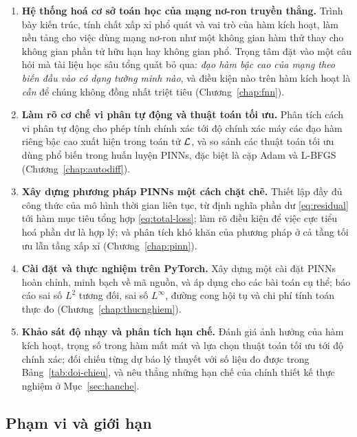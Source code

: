 \begin{enumerate}[label=\textbf{MT\arabic*.},leftmargin=*,itemsep=5pt]
\item \textbf{Hệ thống hoá cơ sở toán học của mạng nơ-ron truyền thẳng.} Trình bày
kiến trúc, tính chất xấp xỉ phổ quát và vai trò của hàm kích hoạt, làm nền tảng
cho việc dùng mạng nơ-ron như một không gian hàm thử thay cho không gian phần tử
hữu hạn hay không gian phổ. Trọng tâm đặt vào một câu hỏi mà tài liệu học sâu tổng
quát bỏ qua: \emph{đạo hàm bậc cao của mạng theo biến đầu vào có dạng tường minh
nào}, và điều kiện nào trên hàm kích hoạt là \emph{cần} để chúng không đồng nhất
triệt tiêu (Chương~\ref{chap:fnn}).
 
\item \textbf{Làm rõ cơ chế vi phân tự động và thuật toán tối ưu.} Phân tích cách
vi phân tự động cho phép tính chính xác tới độ chính xác máy các đạo hàm riêng bậc
cao xuất hiện trong toán tử $\mathcal{L}$, và so sánh các thuật toán tối ưu dùng phổ biến
trong huấn luyện PINNs, đặc biệt là cặp Adam và L-BFGS
(Chương~\ref{chap:autodiff}).
 
\item \textbf{Xây dựng phương pháp PINNs một cách chặt chẽ.} Thiết lập đầy đủ công
thức của mô hình thời gian liên tục, từ định nghĩa phần dư \eqref{eq:residual} tới
hàm mục tiêu tổng hợp \eqref{eq:total-loss}; làm rõ điều kiện để việc cực tiểu hoá
phần dư là hợp lý; và phân tích khó khăn của phương pháp ở cả tầng tối ưu lẫn tầng
xấp xỉ (Chương~\ref{chap:pinn}).
 
\item \textbf{Cài đặt và thực nghiệm trên PyTorch.} Xây dựng một cài đặt PINNs
hoàn chỉnh, minh bạch về mã nguồn, và áp dụng cho các bài toán cụ thể; báo cáo sai
số $L^2$ tương đối, sai số $L^{\infty}$, đường cong hội tụ và chi phí tính toán
thực đo (Chương~\ref{chap:thucnghiem}).
 
\item \textbf{Khảo sát độ nhạy và phân tích hạn chế.} Đánh giá ảnh hưởng của hàm
kích hoạt, trọng số trong hàm mất mát và lựa chọn thuật toán tối ưu tới độ chính
xác; đối chiếu từng dự báo lý thuyết với số liệu đo được trong
Bảng~\ref{tab:doi-chieu}, và nêu thẳng những hạn chế của chính thiết kế thực
nghiệm ở Mục~\ref{sec:hanche}.
\end{enumerate}
 
\subsection{Phạm vi và giới hạn}
\label{subsec:pham-vi}
 
